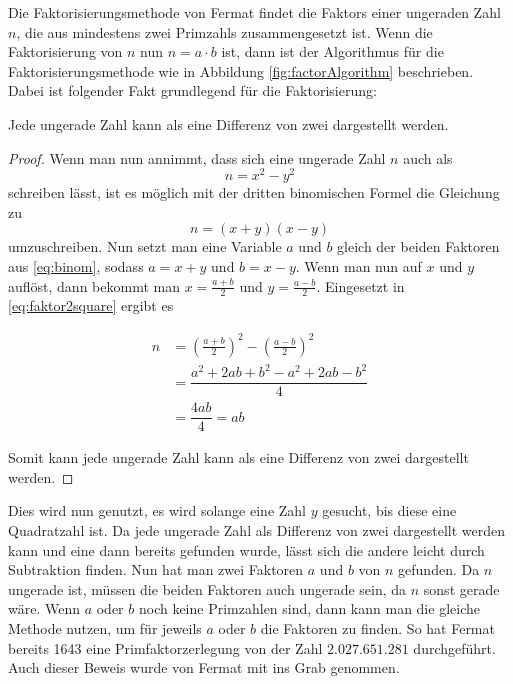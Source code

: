 Die Faktorisierungsmethode von Fermat findet die \Glspl{Faktor} einer  ungeraden Zahl $n$, die aus mindestens zwei \Glspl{Primzahl} zusammengesetzt ist. Wenn die Faktorisierung von $n$ nun $n = a \cdot b$ ist, dann ist der Algorithmus für die Faktorisierungsmethode wie in Abbildung \ref{fig:factorAlgorithm} beschrieben. Dabei ist folgender Fakt grundlegend für die Faktorisierung:

\begin{theorem}
    Jede ungerade Zahl kann als eine Differenz von zwei  dargestellt werden.
\end{theorem}
\begin{proof}
    Wenn man nun annimmt, dass sich eine ungerade Zahl $n$ auch als \begin{equation} \label{eq:faktor2square}
        n = x^2 - y^2
    \end{equation}
    schreiben lässt, ist es möglich mit der dritten binomischen Formel die Gleichung zu
    \begin{equation} \label{eq:binom}
        n = (x+y)(x-y)
    \end{equation}
    umzuschreiben. Nun setzt man eine Variable $a$ und $b$ gleich der beiden Faktoren aus \eqref{eq:binom}, sodass $a = x + y$ und $b = x - y$. Wenn man nun auf $x$ und $y$ auflöst, dann bekommt man $x = \frac{a+b}{2}$ und $y = \frac{a-b}{2}$. Eingesetzt in \eqref{eq:faktor2square} ergibt es

    \begin{align*}
        n & = \left( \frac{a+b}{2} \right)^2 - \left( \frac{a-b}{2} \right)^2 \\
          & = \dfrac{a^2 + 2ab + b^2 - a^2 + 2ab - b^2}{4}                    \\
          & = \dfrac{4ab}{4} = ab
    \end{align*}

    Somit kann jede ungerade Zahl kann als eine Differenz von zwei  dargestellt werden.

\end{proof}

Dies wird nun genutzt, es wird solange eine Zahl $y$ gesucht, bis diese eine \Gls{Quadratzahl} ist. Da jede ungerade Zahl als Differenz von zwei  dargestellt werden kann und eine dann bereits gefunden wurde, lässt sich die andere leicht durch Subtraktion finden. Nun hat man zwei Faktoren $a$ und $b$ von $n$ gefunden. Da $n$ ungerade ist, müssen die beiden Faktoren auch ungerade sein, da $n$ sonst gerade wäre. Wenn $a$ oder $b$ noch keine Primzahlen sind, dann kann man die gleiche Methode nutzen, um für jeweils $a$ oder $b$ die Faktoren zu finden. So hat Fermat bereits 1643 eine Primfaktorzerlegung von der Zahl $2.027.651.281$ durchgeführt. Auch dieser Beweis wurde von Fermat mit ins Grab genommen.

